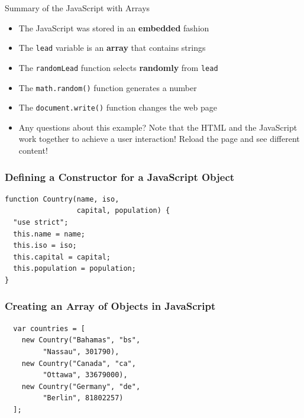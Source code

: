 \documentclass[14pt,aspectratio=169]{beamer}
\begin{document}
%
\begin{frame}{Summary of the JavaScript with Arrays}
  \begin{itemize}
    \item The JavaScript was stored in an {\bf embedded} fashion
      \vspace*{-.15in}
    \item The {\tt lead} variable is an {\bf array} that contains strings
      \vspace*{-.15in}
    \item The {\tt randomLead} function selects {\bf randomly} from {\tt lead}
      \vspace*{-.15in}
    \item The {\tt math.random()} function generates a number
      \vspace*{-.15in}
    \item The {\tt document.write()} function changes the web page
      \vspace*{-.15in}
    \item Any questions about this example? Note that the HTML and the
      JavaScript work together to achieve a user interaction! Reload the
      page and see different content!
      \vspace*{-.15in}
  \end{itemize}
\end{frame}

%
\begin{frame}[fragile]
  \frametitle{Defining a Constructor for a JavaScript Object}
  \normalsize
  \begin{minipage}{6in}
    \vspace*{.2in}
    \begin{verbatim}
function Country(name, iso,
                 capital, population) {
  "use strict";
  this.name = name;
  this.iso = iso;
  this.capital = capital;
  this.population = population;
}
    \end{verbatim}
  \end{minipage}
\end{frame}

%
\begin{frame}[fragile]
  \frametitle{Creating an Array of Objects in JavaScript}
  \normalsize
  \begin{minipage}{6in}
    \vspace*{.2in}
    \begin{verbatim}
  var countries = [
    new Country("Bahamas", "bs",
         "Nassau", 301790),
    new Country("Canada", "ca",
         "Ottawa", 33679000),
    new Country("Germany", "de",
         "Berlin", 81802257)
  ];
    \end{verbatim}
  \end{minipage}
\end{frame}
\end{document}
